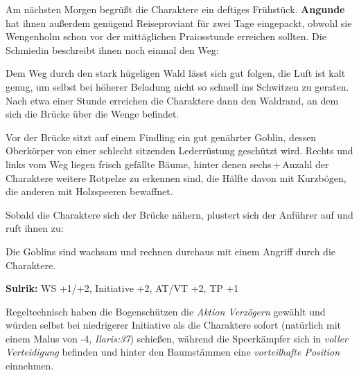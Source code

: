
\vfill


\newpage


Am nächsten Morgen begrüßt die Charaktere ein deftiges Frühstück.
\textbf{Angunde} hat ihnen außerdem genügend Reiseproviant für zwei Tage eingepackt, obwohl sie Wengenholm schon vor der mittäglichen Praiosstunde erreichen sollten.
Die Schmiedin beschreibt ihnen noch einmal den Weg:

Dem Weg durch den stark hügeligen Wald lässt sich gut folgen, die Luft ist kalt genug, um selbst bei höherer Beladung nicht so schnell ins Schwitzen zu geraten.
Nach etwa einer Stunde erreichen die Charaktere dann den Waldrand, an dem sich die Brücke über die Wenge befindet.

Vor der Brücke sitzt auf einem Findling ein gut genährter Goblin, dessen Oberkörper von einer schlecht sitzenden Lederrüstung geschützt wird. Rechts und links vom Weg liegen frisch gefällte Bäume, hinter denen sechs\,+\,Anzahl der Charaktere weitere Rotpelze zu erkennen sind, die Hälfte davon mit Kurzbögen, die anderen mit Holzspeeren bewaffnet.

Sobald die Charaktere sich der Brücke nähern, plustert sich der Anführer auf und ruft ihnen zu:

Die Goblins sind wachsam und rechnen durchaus mit einem Angriff durch die Charaktere.

\kreaturgoblin
\textbf{Sulrik:} WS +1/+2, Initiative +2, AT/VT +2, TP +1



Regeltechnisch haben die Bogenschützen die \emph{Aktion Verzögern} gewählt und würden selbst bei niedrigerer Initiative als die Charaktere sofort (natürlich mit einem Malus von -4, \textit{Ilaris:37}) schießen, während die Speerkämpfer sich in \textit{voller Verteidigung} befinden und hinter den Baumstämmen eine \emph{vorteilhafte Position} einnehmen.


